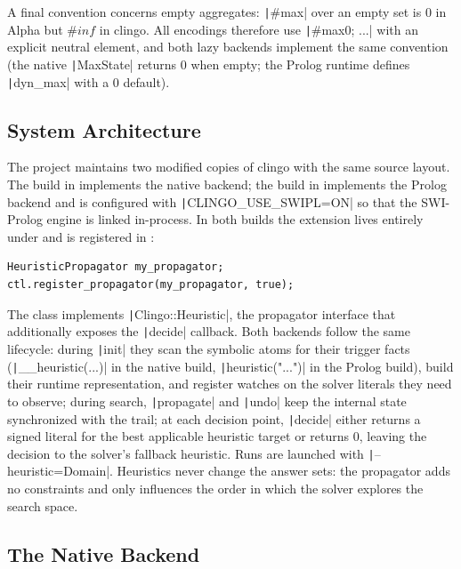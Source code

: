 A final convention concerns empty aggregates: \texttt|#max| over an empty set is $0$ in Alpha but $\#\mathit{inf}$ in clingo. All encodings therefore use \texttt|#max{0; ...}| with an explicit neutral element, and both lazy backends implement the same convention (the native \texttt|MaxState| returns $0$ when empty; the Prolog runtime defines \texttt|dyn_max| with a $0$ default).

\subsection{System Architecture}

The project maintains two modified copies of clingo with the same source layout. The build in  implements the native backend; the build in  implements the Prolog backend and is configured with \texttt|CLINGO_USE_SWIPL=ON| so that the SWI-Prolog engine is linked in-process. In both builds the extension lives entirely under  and is registered in :

\begin{verbatim}
HeuristicPropagator my_propagator;
ctl.register_propagator(my_propagator, true);
\end{verbatim}

The class implements \texttt|Clingo::Heuristic|, the propagator interface that additionally exposes the \texttt|decide| callback. Both backends follow the same lifecycle: during \texttt|init| they scan the symbolic atoms for their trigger facts (\texttt|__heuristic(...)| in the native build, \texttt|heuristic("...")| in the Prolog build), build their runtime representation, and register watches on the solver literals they need to observe; during search, \texttt|propagate| and \texttt|undo| keep the internal state synchronized with the trail; at each decision point, \texttt|decide| either returns a signed literal for the best applicable heuristic target or returns $0$, leaving the decision to the solver's fallback heuristic. Runs are launched with \texttt|--heuristic=Domain|. Heuristics never change the answer sets: the propagator adds no constraints and only influences the order in which the solver explores the search space.

\subsection{The Native Backend}

